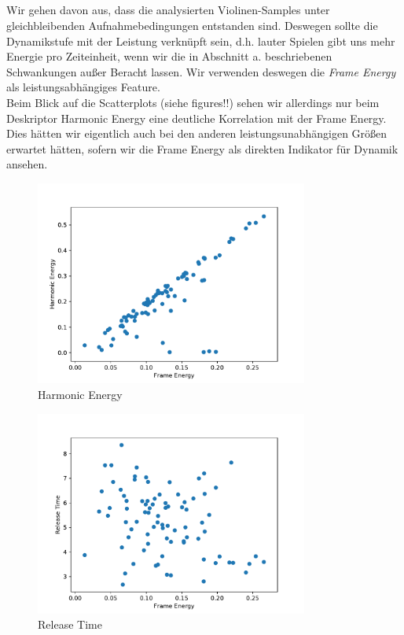 \subsection{}
Wir gehen davon aus, dass die analysierten Violinen-Samples unter gleichbleibenden Aufnahmebedingungen entstanden sind. 
Deswegen sollte die Dynamikstufe mit der Leistung verknüpft sein, d.h. lauter Spielen gibt uns mehr Energie pro Zeiteinheit, wenn wir die in Abschnitt a. beschriebenen Schwankungen außer Beracht lassen. Wir verwenden deswegen die \textit{Frame Energy} als leistungsabhängiges Feature. \\
Beim Blick auf die Scatterplots (siehe figures!!) sehen wir allerdings nur beim Deskriptor Harmonic Energy eine deutliche Korrelation mit der Frame Energy. 
Dies hätten wir eigentlich auch bei den anderen leistungsunabhängigen Größen erwartet hätten, sofern wir die Frame Energy als direkten Indikator für Dynamik ansehen.

\begin{figure}[H]
    \center
    \includegraphics[width = 0.8\textwidth]{Figures/harmonicErg}
    \caption{Harmonic Energy}
    \label{fig:im}
\end{figure}

\begin{figure}[H]
    \center
    \includegraphics[width = 0.8\textwidth]{Figures/rel.pdf}
    \caption{Release Time}
    \label{fig:im}
\end{figure}

